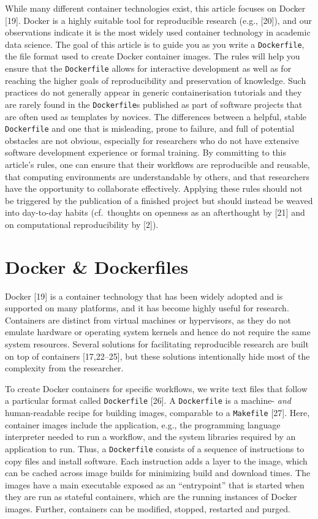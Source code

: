 \documentclass[10pt,letterpaper]{article}
\begin{document}
While many different container technologies exist, this article focuses
on Docker {[}19{]}. Docker is a highly suitable tool for reproducible
research (e.g., {[}20{]}), and our observations indicate it is the most
widely used container technology in academic data science. The goal of
this article is to guide you as you write a \texttt{Dockerfile}, the
file format used to create Docker container images. The rules will help
you ensure that the \texttt{Dockerfile} allows for interactive
development as well as for reaching the higher goals of reproducibility
and preservation of knowledge. Such practices do not generally appear in
generic containerisation tutorials and they are rarely found in the
\texttt{Dockerfile}s published as part of software projects that are
often used as templates by novices. The differences between a helpful,
stable \texttt{Dockerfile} and one that is misleading, prone to failure,
and full of potential obstacles are not obvious, especially for
researchers who do not have extensive software development experience or
formal training. By committing to this article's rules, one can ensure
that their workflows are reproducible and reusable, that computing
environments are understandable by others, and that researchers have the
opportunity to collaborate effectively. Applying these rules should not
be triggered by the publication of a finished project but should instead
be weaved into day-to-day habits (cf.~thoughts on openness as an
afterthought by {[}21{]} and on computational reproducibility by
{[}2{]}).

\hypertarget{docker-dockerfiles}{%
\section{Docker \& Dockerfiles}\label{docker-dockerfiles}}

Docker {[}19{]} is a container technology that has been widely adopted
and is supported on many platforms, and it has become highly useful for
research. Containers are distinct from virtual machines or hypervisors,
as they do not emulate hardware or operating system kernels and hence do
not require the same system resources. Several solutions for
facilitating reproducible research are built on top of containers
{[}17,22--25{]}, but these solutions intentionally hide most of the
complexity from the researcher.

To create Docker containers for specific workflows, we write text files
that follow a particular format called \texttt{Dockerfile} {[}26{]}. A
\texttt{Dockerfile} is a machine- \emph{and} human-readable recipe for
building images, comparable to a \texttt{Makefile} {[}27{]}. Here,
container images include the application, e.g., the programming language
interpreter needed to run a workflow, and the system libraries required
by an application to run. Thus, a \texttt{Dockerfile} consists of a
sequence of instructions to copy files and install software. Each
instruction adds a layer to the image, which can be cached across image
builds for minimizing build and download times. The images have a main
executable exposed as an ``entrypoint'' that is started when they are
run as stateful containers, which are the running instances of Docker
images. Further, containers can be modified, stopped, restarted and
purged.
\end{document}

